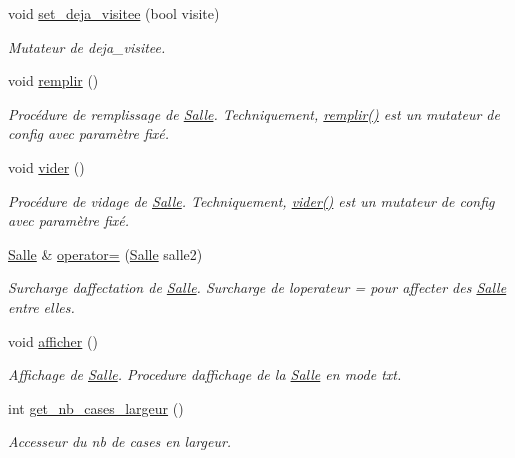\begin{DoxyCompactItemize}
void \hyperlink{classSalle_a2c5dfa8f0e6b6c427203812d8d91524a}{set\+\_\+deja\+\_\+visitee} (bool visite)
\begin{DoxyCompactList}\small\item\em Mutateur de {\itshape deja\+\_\+visitee}. \end{DoxyCompactList}\item 
void \hyperlink{classSalle_ae6fd7211225455d887859f983e3bddce}{remplir} ()
\begin{DoxyCompactList}\small\item\em Procédure de remplissage de \hyperlink{classSalle}{Salle}. Techniquement, \hyperlink{classSalle_ae6fd7211225455d887859f983e3bddce}{remplir()} est un mutateur de {\itshape config} avec paramètre fixé. \end{DoxyCompactList}\item 
void \hyperlink{classSalle_ae8248a5ded8514be67a29efdeb70af96}{vider} ()
\begin{DoxyCompactList}\small\item\em Procédure de vidage de \hyperlink{classSalle}{Salle}. Techniquement, \hyperlink{classSalle_ae8248a5ded8514be67a29efdeb70af96}{vider()} est un mutateur de {\itshape config} avec paramètre fixé. \end{DoxyCompactList}\item 
\hyperlink{classSalle}{Salle} \& \hyperlink{classSalle_a315947e357a3fd958b40eb087a82c4d7}{operator=} (\hyperlink{classSalle}{Salle} salle2)
\begin{DoxyCompactList}\small\item\em Surcharge d\textquotesingle{}affectation de \hyperlink{classSalle}{Salle}. Surcharge de l\textquotesingle{}operateur = pour affecter des \hyperlink{classSalle}{Salle} entre elles. \end{DoxyCompactList}\item 
void \hyperlink{classSalle_a50ed839f1a93753fddf6171ef343a0bb}{afficher} ()
\begin{DoxyCompactList}\small\item\em Affichage de \hyperlink{classSalle}{Salle}. Procedure d\textquotesingle{}affichage de la \hyperlink{classSalle}{Salle} en mode txt. \end{DoxyCompactList}\item 
int \hyperlink{classSalle_a938849a06f5906cc6b3a66e979f02a9a}{get\+\_\+nb\+\_\+cases\+\_\+largeur} ()
\begin{DoxyCompactList}\small\item\em Accesseur du nb de cases en largeur. \end{DoxyCompactList}\item 

\end{DoxyCompactItemize}
